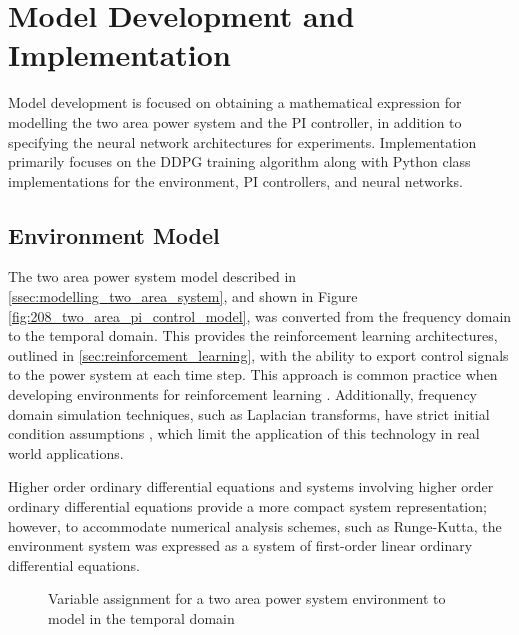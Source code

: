 \section{Model Development and Implementation}
Model development is focused on obtaining a mathematical expression for modelling the two area power system and the PI controller, in addition to specifying the neural network architectures for experiments. Implementation primarily focuses on the DDPG training algorithm along with Python class implementations for the environment, PI controllers, and neural networks.


\subsection{Environment Model} \label{ssec:env_modelling}
The two area power system model described in \textsection \ref{ssec:modelling_two_area_system}, and shown in Figure \ref{fig:208_two_area_pi_control_model}, was converted from the frequency domain to the temporal domain. This provides the reinforcement learning architectures, outlined in \textsection \ref{sec:reinforcement_learning}, with the ability to export control signals to the power system at each time step. This approach is common practice when developing environments for reinforcement learning \cite{Brockman2016}. Additionally, frequency domain simulation techniques, such as Laplacian transforms, have strict initial condition assumptions \cite{Ogat2010}, which limit the application of this technology in real world applications.

Higher order ordinary differential equations and systems involving higher order ordinary differential equations provide a more compact system representation; however, to accommodate numerical analysis schemes, such as Runge-Kutta, the environment system was expressed as a system of first-order linear ordinary differential equations.

\begin{figure}[h]
	\centering
	\resizebox{\textwidth}{!}{}
	\caption[Two-area power system ODE derivation]{Variable assignment for a two area power system environment to model in the temporal domain}
	\label{4101_two_area_power_system_temporal_model}
\end{figure}

